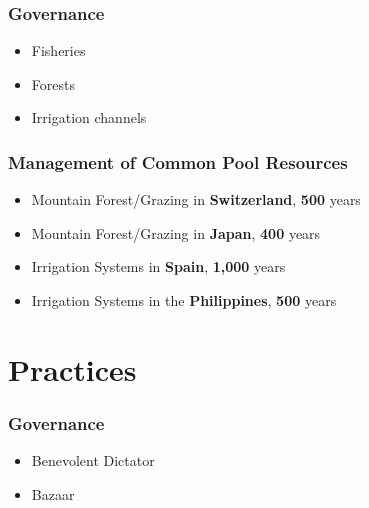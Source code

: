 \documentclass[18pt]{beamer}
\begin{document}
\begin{frame}
\frametitle{Governance}
\Huge
\begin{itemize}
\item Fisheries
\pause
\item Forests
\pause
\item Irrigation channels
\end{itemize}
\end{frame}


\begin{frame}
\frametitle{Management of Common Pool Resources}
\Large
\begin{itemize}
\item Mountain Forest/Grazing in \textbf{Switzerland}, \textbf{500} years
\pause
\item Mountain Forest/Grazing in \textbf{Japan}, \textbf{400} years
\pause
\item Irrigation Systems in \textbf{Spain}, \textbf{1,000} years
\pause
\item Irrigation Systems in the \textbf{Philippines}, \textbf{500} years
\end{itemize}
\end{frame}


\section{Practices}

\begin{frame}
\frametitle{Governance}
\Huge
\begin{itemize}
\item Benevolent Dictator
\pause
\item Bazaar
\end{itemize}
\end{frame}


{
\begin{frame}[plain]
\end{frame}
}
\end{document}
